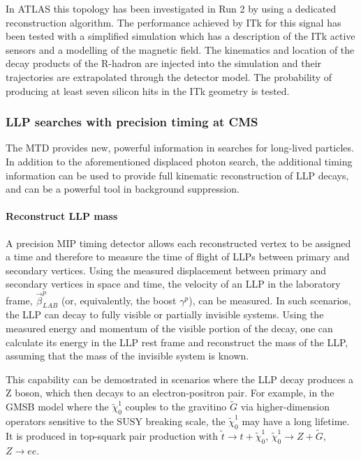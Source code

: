  In ATLAS this topology has been investigated in Run 2 by using a dedicated reconstruction algorithm.
The performance achieved by ITk for this signal has been tested  with
a simplified simulation which has a description of the ITk active sensors and a modelling
of the magnetic field. 
The kinematics and location of the decay products of the R-hadron
are injected into the simulation and their trajectories are extrapolated through the detector model. 
The probability of producing at least seven silicon hits in the ITk geometry is tested. 


\subsubsection{LLP searches with precision timing at CMS}

The MTD provides new, powerful information in searches for long-lived particles. 
In addition to the aforementioned displaced photon search, the additional timing information can be used to provide full kinematic reconstruction of LLP decays, and can be a powerful tool in background suppression. 

\paragraph{Reconstruct LLP mass}
A precision MIP timing detector allows each reconstructed vertex to be assigned a time and therefore to measure the time of flight of LLPs between primary and secondary vertices. 
Using the measured displacement between primary and secondary vertices in space and time, the velocity of an LLP in
the laboratory frame, $\vec{\beta}_{LAB}^{p}$ (or, equivalently, the boost $\gamma^p$), can be measured. In such scenarios, the LLP can decay to fully visible or partially invisible systems. 
Using the measured energy and momentum of the visible portion of the decay, one can calculate its energy in the LLP rest frame and reconstruct the mass of the LLP, assuming that the mass of the invisible system is known. 

This capability can be demostrated in scenarios where the LLP decay produces a Z boson, which then decays to an electron-positron pair.
For example, in the GMSB model where the $\tilde{\chi}_0^1$ couples
to the gravitino $\tilde{G}$ via higher-dimension operators sensitive to the SUSY breaking scale, the $\tilde{\chi}_0^1$ may have a long lifetime. 
It is produced in top-squark pair production with 
$\tilde{t}\to t+\tilde{\chi}_0^1$, $\tilde{\chi}_0^1 \to Z+\tilde{G}$, $Z\to ee$.

